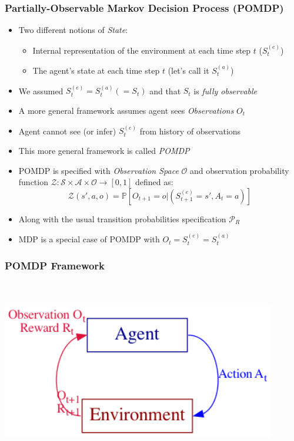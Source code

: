 \documentclass[handout]{beamer}
\begin{document}
\begin{frame}
\frametitle{Partially-Observable Markov Decision Process (POMDP)}
\pause
\begin{itemize}[<+->]
\item Two different notions of {\em State}:
\begin{itemize}
\item Internal representation of the environment at each time step $t$ ($S_t^{(e)}$)
\item The agent's state at each time step $t$ (let's call it $S_t^{(a)}$)
\end{itemize}
\item We assumed $S_t^{(e)} = S_t^{(a)} (= S_t)$ and that $S_t$ is {\em fully observable}
\item A more general framework assumes agent sees {\em Observations} $O_t$
\item Agent cannot see (or infer) $S_t^{(e)}$ from history of observations
\item This more general framework is called {\em POMDP}
\item POMDP is specified with {\em Observation Space} $\mathcal{O}$ and observation probability function 
$\mathcal{Z}: \mathcal{S} \times \mathcal{A} \times \mathcal{O} \rightarrow [0, 1]$
defined as:
$$\mathcal{Z}(s', a, o) = \mathbb{P}[O_{t+1} = o | (S_{t+1}^{(e)} = s', A_t = a)]$$
\item Along with the usual transition probabilities specification $\mathcal{P}_R$
\item MDP is a special case of POMDP with $O_t = S_t^{(e)} = S_t^{(a)}$
\end{itemize}
\end{frame}

\begin{frame}
\frametitle{POMDP Framework}
\includegraphics[width=12cm, height=8cm]{pomdp.png}
\end{frame}
\end{document}
